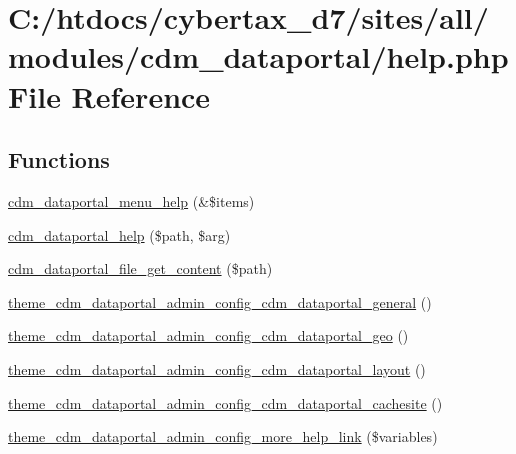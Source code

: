 \hypertarget{help_8php}{\section{C\-:/htdocs/cybertax\-\_\-d7/sites/all/modules/cdm\-\_\-dataportal/help.php File Reference}
\label{help_8php}
}
\subsection*{Functions}
\begin{DoxyCompactItemize}
\item 
\hyperlink{help_8php_a3866bbd3251dc3d83925fc9570491f42}{cdm\-\_\-dataportal\-\_\-menu\-\_\-help} (\&\$items)
\item 
\hyperlink{help_8php_ac17fa7554baeba7f37061ac4cdced3bf}{cdm\-\_\-dataportal\-\_\-help} (\$path, \$arg)
\item 
\hyperlink{help_8php_a1533def39b6aeb194903d284ca3f809f}{cdm\-\_\-dataportal\-\_\-file\-\_\-get\-\_\-content} (\$path)
\item 
\hyperlink{help_8php_a2ed20c7405ccbcde982069361277e62f}{theme\-\_\-cdm\-\_\-dataportal\-\_\-admin\-\_\-config\-\_\-cdm\-\_\-dataportal\-\_\-general} ()
\item 
\hyperlink{help_8php_a533691c813688a61df1776a703124fc5}{theme\-\_\-cdm\-\_\-dataportal\-\_\-admin\-\_\-config\-\_\-cdm\-\_\-dataportal\-\_\-geo} ()
\item 
\hyperlink{help_8php_a05887c5d3a3adcd08aa78b1cd5d97eee}{theme\-\_\-cdm\-\_\-dataportal\-\_\-admin\-\_\-config\-\_\-cdm\-\_\-dataportal\-\_\-layout} ()
\item 
\hyperlink{help_8php_a255a43db2201f92576d747b0888b4a9e}{theme\-\_\-cdm\-\_\-dataportal\-\_\-admin\-\_\-config\-\_\-cdm\-\_\-dataportal\-\_\-cachesite} ()
\item 
\hyperlink{help_8php_a8012b278c18c6ec13f3c2643f7ab0ae7}{theme\-\_\-cdm\-\_\-dataportal\-\_\-admin\-\_\-config\-\_\-more\-\_\-help\-\_\-link} (\$variables)
\end{DoxyCompactItemize}
